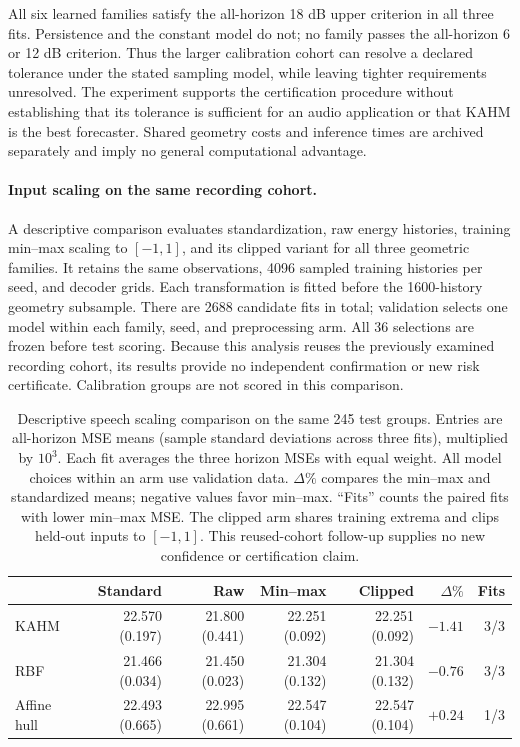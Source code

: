All six learned families satisfy the all-horizon 18 dB upper criterion in
all three fits. Persistence and the constant model do not; no family passes
the all-horizon 6 or 12 dB criterion. Thus the larger calibration cohort can
resolve a declared tolerance under the stated sampling model, while leaving
tighter requirements unresolved. The experiment supports the certification
procedure without establishing that its tolerance is sufficient for an audio
application or that KAHM is the best forecaster. Shared geometry costs and inference times
are archived separately and imply no general computational advantage.

\paragraph{Input scaling on the same recording cohort.}
A descriptive comparison evaluates standardization, raw energy histories,
training min--max scaling to $[-1,1]$, and its clipped variant for all three
geometric families. It retains the same observations, 4096 sampled training
histories per seed, and decoder grids. Each transformation is fitted before
the 1600-history geometry subsample. There are 2688 candidate fits in total;
validation selects one model within each family, seed, and preprocessing arm.
All 36 selections are frozen before test scoring. Because this analysis
reuses the previously examined recording cohort, its results provide no
independent confirmation or new risk certificate. Calibration groups are
not scored in this comparison.

\begin{table}[t]
\centering
\small
\setlength{\tabcolsep}{3.5pt}
\begin{tabular}{lrrrrrr}
\toprule
& Standard & Raw & Min--max & Clipped & $\Delta\%$ & Fits \\
\midrule
KAHM & 22.570 (0.197) & 21.800 (0.441) & 22.251 (0.092) & 22.251 (0.092) & $-1.41$ & 3/3 \\
RBF & 21.466 (0.034) & 21.450 (0.023) & 21.304 (0.132) & 21.304 (0.132) & $-0.76$ & 3/3 \\
Affine hull & 22.493 (0.665) & 22.995 (0.661) & 22.547 (0.104) & 22.547 (0.104) & $+0.24$ & 1/3 \\
\bottomrule
\end{tabular}
\caption{Descriptive speech scaling comparison on the same 245 test groups.
Entries are all-horizon MSE means (sample standard deviations across three fits),
multiplied by $10^3$. Each fit averages the three horizon MSEs with equal weight.
All model choices within an arm use validation data. $\Delta\%$ compares the
min--max and standardized means; negative values favor min--max. ``Fits'' counts
the paired fits with lower min--max MSE. The clipped arm shares training extrema
and clips held-out inputs to $[-1,1]$. This reused-cohort follow-up supplies no
new confidence or certification claim.}
\label{tab:speech-scaling}
\end{table}


